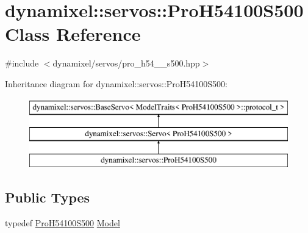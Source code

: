 \hypertarget{classdynamixel_1_1servos_1_1_pro_h54100_s500}{}\section{dynamixel\+:\+:servos\+:\+:Pro\+H54100\+S500 Class Reference}
\label{classdynamixel_1_1servos_1_1_pro_h54100_s500}


{\ttfamily \#include $<$dynamixel/servos/pro\+\_\+h54\+\_\+\_\+s500.\+hpp$>$}

Inheritance diagram for dynamixel\+:\+:servos\+:\+:Pro\+H54100\+S500\+:\begin{figure}[H]
\begin{center}
\leavevmode
\includegraphics[height=3.000000cm]{classdynamixel_1_1servos_1_1_pro_h54100_s500}
\end{center}
\end{figure}
\subsection*{Public Types}
\begin{DoxyCompactItemize}
\item 
typedef \hyperlink{classdynamixel_1_1servos_1_1_pro_h54100_s500}{Pro\+H54100\+S500} \hyperlink{classdynamixel_1_1servos_1_1_pro_h54100_s500_af84896e20b81ef47892a90f9fa807b28}{Model}
\end{DoxyCompactItemize}

